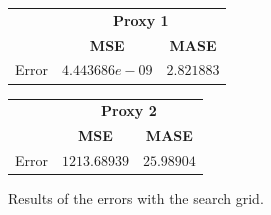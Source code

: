 \begin{figure}[!h]
\centering
\begin{minipage}{\textwidth}
\begin{minipage}{0.5\textwidth}
\begin{center}
\vskip10pt
   \begin{footnotesize}
   \begin{tabular}{|c|c|c|}
   \hline
   & \multicolumn{2}{|c|}{\textbf{Proxy 1}} \\ \cline{2-3}
   & \textbf{MSE} & \textbf{MASE}          \\ \hline
   Error & $4.443686e-09$ & $2.821883$     \\ 
   \hline
   \end{tabular}
   \end{footnotesize}
\end{center}
\end{minipage}
\begin{minipage}{0.5\textwidth}
\begin{center}
\vskip12pt
   \begin{footnotesize}
   \begin{tabular}{|c|c|c|}
   \hline
   & \multicolumn{2}{|c|}{\textbf{Proxy 2}} \\ \cline{2-3}
   & \textbf{MSE} & \textbf{MASE}          \\ \hline
   Error & $1213.68939$      & $25.98904$     \\ 
   \hline
   \end{tabular}
   \end{footnotesize}
\end{center}
\end{minipage}
\end{minipage}
\caption{Results of the errors with the search grid.}
\label{fig:table10yNaive}
\end{figure}
